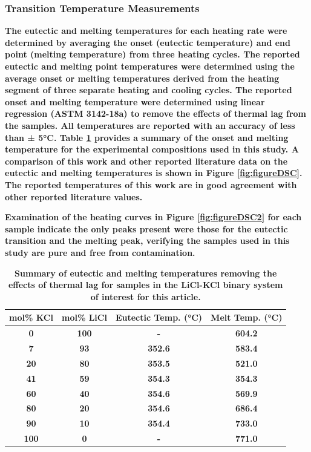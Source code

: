 \documentclass[review]{elsarticle}
\providecommand{\DIFaddtex}[1]{{\bf #1}} %
\providecommand{\DIFaddbegin}{\protect\color{blue}} %
\providecommand{\DIFaddFL}[1]{\DIFadd{#1}} %
\providecommand{\DIFadd}[1]{\texorpdfstring{\DIFaddtex{#1}}{#1}} %
\newcommand{\DIFaddincludegraphics}[2][]{{\color{blue}\fbox{\DIFOincludegraphics[#1]{#2}}}} %
\DeclareRobustCommand{\DIFaddbegin}{\DIFOaddbegin \let\includegraphics\DIFaddincludegraphics} %
\begin{document}
\FloatBarrier

\DIFaddbegin \subsubsection{\DIFadd{Transition Temperature Measurements}}

\DIFadd{The eutectic and melting temperatures for each heating rate were determined by averaging the onset (eutectic temperature) and end point (melting temperature) from three heating cycles. The reported eutectic and melting point temperatures were determined using the average onset or melting temperatures derived from the heating segment of three separate heating and cooling cycles. The reported onset and melting temperature were determined using linear regression (ASTM 3142-18a) to remove the effects of thermal lag from the samples. All temperatures are reported with an accuracy of less than ± 5°C. Table \ref{tableDSC} provides a summary of the onset and melting temperature for the experimental compositions used in this study. A comparison of this work and other reported literature data on the eutectic and melting temperatures is shown in Figure \ref{fig:figureDSC}. The reported temperatures of this work are in good agreement with other reported literature values. 
}

\DIFadd{Examination of the heating curves in Figure \ref{fig:figureDSC2} for each sample indicate the only peaks present were those for the eutectic transition and the melting peak, verifying the samples used in this study are pure and free from contamination. 
}

\begin{table}[h]
\centering
\caption{\DIFaddFL{Summary of eutectic and melting temperatures removing the effects of thermal lag for samples in the LiCl-KCl binary system of interest for this article.}}
\begin{tabular}{|c|c|c|c|}
\hline
\DIFaddFL{mol\% KCl }& \DIFaddFL{mol\% LiCl }& \DIFaddFL{Eutectic Temp. (°C) }& \DIFaddFL{Melt Temp. (°C)}\\
\hline
\DIFaddFL{0       }& \DIFaddFL{100        }& \DIFaddFL{-            }& \DIFaddFL{604.2 }\\
\DIFaddFL{7       }& \DIFaddFL{93         }& \DIFaddFL{352.6        }& \DIFaddFL{583.4 }\\
\DIFaddFL{20      }& \DIFaddFL{80         }& \DIFaddFL{353.5        }& \DIFaddFL{521.0 }\\
\DIFaddFL{41      }& \DIFaddFL{59         }& \DIFaddFL{354.3        }& \DIFaddFL{354.3 }\\
\DIFaddFL{60      }& \DIFaddFL{40         }& \DIFaddFL{354.6        }& \DIFaddFL{569.9 }\\
\DIFaddFL{80      }& \DIFaddFL{20         }& \DIFaddFL{354.6        }& \DIFaddFL{686.4 }\\
\DIFaddFL{90      }& \DIFaddFL{10         }& \DIFaddFL{354.4        }& \DIFaddFL{733.0 }\\
\DIFaddFL{100     }& \DIFaddFL{0          }& \DIFaddFL{-            }& \DIFaddFL{771.0 }\\
\hline
\end{tabular}
\label{tableDSC}
\end{table}
\end{document}
